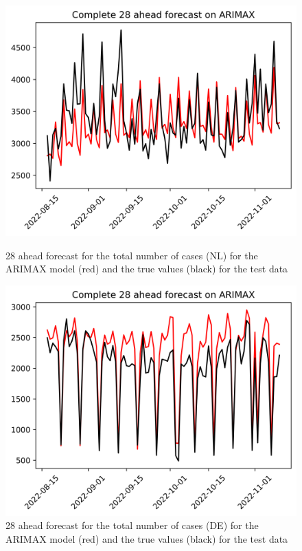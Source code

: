\begin{figure}

\begin{minipage}{.45\textwidth}
  \centering
  \includegraphics[width=\linewidth]{pics/28_ah/Complete_28_ahead_ARIMAX.png}
  \caption{28 ahead forecast for the total number of cases (NL) for the ARIMAX model (red) and the true values (black) for the test data}
  \label{fig:tot_cases_fc_28_ARIMAX}
\end{minipage}
\begin{minipage}{.45\textwidth}
  \centering
  \includegraphics[width=\linewidth]{pics/28_ah/DE_Complete_28_ahead_ARIMAX.png}
  \caption{28 ahead forecast for the total number of cases (DE) for the ARIMAX model (red) and the true values (black) for the test data}
  \label{fig:tot_cases_fc_28_ARIMAX_DE}
\end{minipage}

\end{figure}
